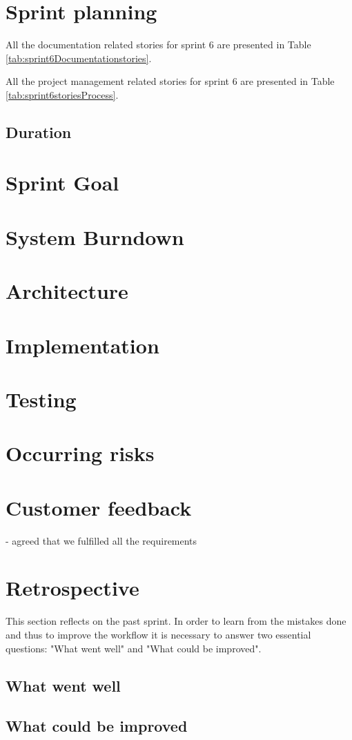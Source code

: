 \section{Sprint planning}

All the documentation related stories for sprint 6 are presented in Table \ref{tab:sprint6Documentationstories}.


All the project management related stories for sprint 6 are presented in Table \ref{tab:sprint6storiesProcess}.


\subsection{Duration}

\section{Sprint Goal}

\section{System Burndown}

\section{Architecture}
\section{Implementation}
\section{Testing}
\section{Occurring risks}
\section{Customer feedback}
- agreed that we fulfilled all the requirements

\section{Retrospective}
This section reflects on the past sprint. In order to learn from the mistakes done and thus to improve the workflow it is necessary to answer two essential questions: "What went well" and "What could be improved".

\subsection{What went well}
\subsection{What could be improved}
